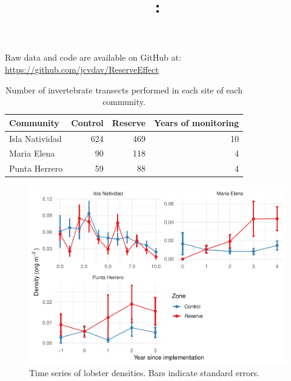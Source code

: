 \documentclass[utf8]{frontiers_suppmat} %
\begin{document}
\onecolumn
{}

\title[Supplementary Material]{{}:
\\ } %


\maketitle


Raw data and code are available on GitHub at: \url{https://github.com/jcvdav/ReserveEffect}

\begin{table}[t]

\caption{\label{tab:unnamed-chunk-2}Number of invertebrate transects performed in each site of each community.}
\centering
\begin{tabular}{lrrr}
\toprule
Community & Control & Reserve & Years of monitoring\\
\midrule
Isla Natividad & 624 & 469 & 10\\
Maria Elena & 90 & 118 & 4\\
Punta Herrero & 59 & 88 & 4\\
\bottomrule
\end{tabular}
\end{table}

\begin{figure}
\centering
\includegraphics{SupplementaryMaterial_files/figure-latex/unnamed-chunk-3-1.pdf}
\caption{\label{fig:unnamed-chunk-3}Time series of lobster densities. Bars indicate standard errors.}
\end{figure}
\end{document}
